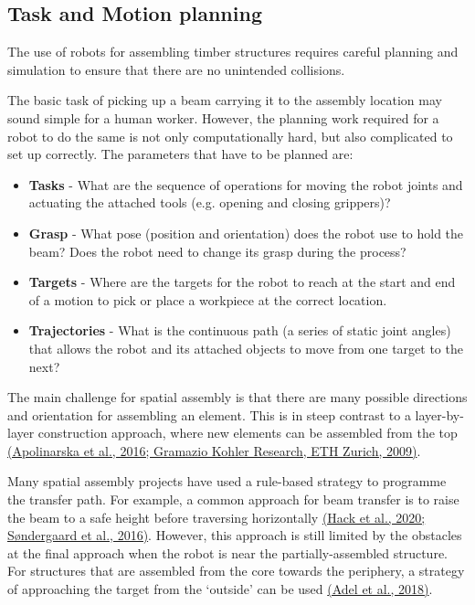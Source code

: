 \subsection{Task and Motion planning}

The use of robots for assembling timber structures requires careful planning and simulation to ensure that there are no unintended collisions. 

The basic task of picking up a beam carrying it to the assembly location may sound simple for a human worker. However, the planning work required for a robot to do the same is not only computationally hard, but also complicated to set up correctly. The parameters that have to be planned are:

\begin{itemize}
	\item \textbf{Tasks} - What are the sequence of operations for moving the robot joints and actuating the attached tools (e.g. opening and closing grippers)?

	\item \textbf{Grasp }- What pose (position and orientation) does the robot use to hold the beam? Does the robot need to change its grasp during the process?

	\item \textbf{Targets }- Where are the targets for the robot to reach at the start and end of a motion to pick or place a workpiece at the correct location.

	\item \textbf{Trajectories }- What is the continuous path (a series of static joint angles) that allows the robot and its attached objects to move from one target to the next?

\end{itemize}
The main challenge for spatial assembly is that there are many possible directions and orientation for assembling an element. This is in steep contrast to a layer-by-layer construction approach, where new elements can be assembled from the top \href{https://www.zotero.org/google-docs/?vZK1dq}{(Apolinarska et al., 2016; Gramazio Kohler Research, ETH Zurich, 2009)}. 

Many spatial assembly projects have used a rule-based strategy to programme the transfer path. For example, a common approach for beam transfer is to raise the beam to a safe height before traversing horizontally \href{https://www.zotero.org/google-docs/?SFqNJ2}{(Hack et al., 2020; Søndergaard et al., 2016)}. However, this approach is still limited by the obstacles at the final approach when the robot is near the partially-assembled structure. For structures that are assembled from the core towards the periphery, a strategy of approaching the target from the ‘outside’ can be used \href{https://www.zotero.org/google-docs/?aftLlm}{(Adel et al., 2018)}. 

